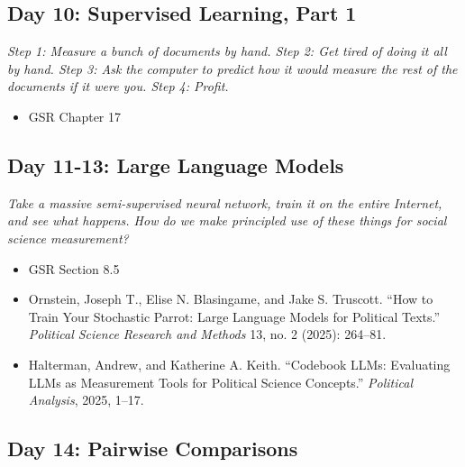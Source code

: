 \documentclass[11pt, letterpaper]{article}
\begin{document}
\subsection*{Day 10: Supervised Learning, Part 1}

\textit{Step 1: Measure a bunch of documents by hand. Step 2: Get tired of doing it all by hand. Step 3: Ask the computer to predict how it would measure the rest of the documents if it were you. Step 4: Profit.}

\begin{itemize}
	\item GSR Chapter 17
\end{itemize}


\subsection*{Day 11-13: Large Language Models}

\textit{Take a massive semi-supervised neural network, train it on the entire Internet, and see what happens. How do we make principled use of these things for social science measurement?}

\begin{itemize}
	\item GSR Section 8.5
	\item Ornstein, Joseph T., Elise N. Blasingame, and Jake S. Truscott. “How to Train Your Stochastic Parrot: Large Language Models for Political Texts.” \textit{Political Science Research and Methods} 13, no. 2 (2025): 264–81.
	\item Halterman, Andrew, and Katherine A. Keith. “Codebook LLMs: Evaluating LLMs as Measurement Tools for Political Science Concepts.” \textit{Political Analysis}, 2025, 1–17.

\end{itemize}

\subsection*{Day 14: Pairwise Comparisons}
\end{document}

